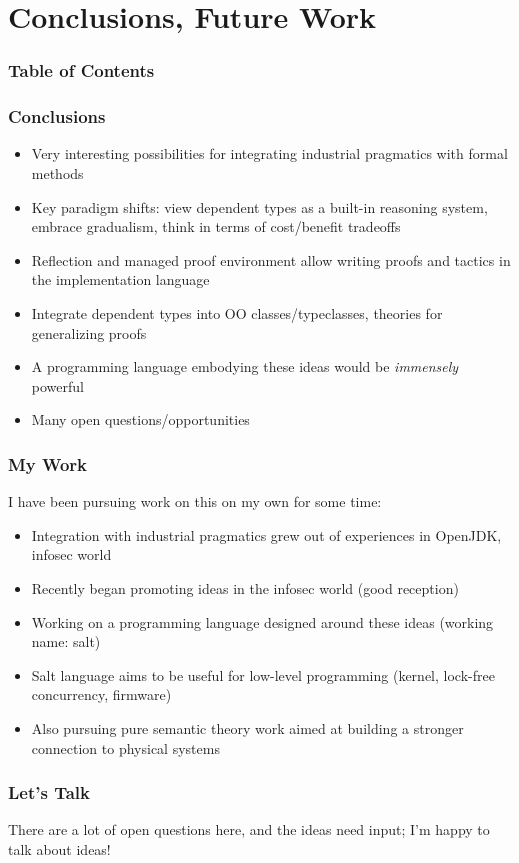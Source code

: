 \documentclass{beamer}
\begin{document}
\section{Conclusions, Future Work}

\begin{frame}
  \frametitle{Table of Contents}
  \tableofcontents[currentsection]
\end{frame}


\begin{frame}
  \frametitle{Conclusions}
  \begin{itemize}
    \item Very interesting possibilities for integrating industrial
      pragmatics with formal methods
    \item Key paradigm shifts: view dependent types as a built-in
      reasoning system, embrace gradualism, think in terms of
      cost/benefit tradeoffs
    \item Reflection and managed proof environment allow writing
      proofs and tactics in the implementation language
    \item Integrate dependent types into OO classes/typeclasses,
      theories for generalizing proofs
    \item A programming language embodying these ideas would be
      \emph{immensely} powerful
    \item Many open questions/opportunities
  \end{itemize}
\end{frame}

\begin{frame}
  \frametitle{My Work}
  I have been pursuing work on this on my own for some time:
  \begin{itemize}
    \item Integration with industrial pragmatics grew out of
      experiences in OpenJDK, infosec world
    \item Recently began promoting ideas in the infosec world (good reception)
    \item Working on a programming language designed around these
      ideas (working name: salt)
    \item Salt language aims to be useful for low-level programming
      (kernel, lock-free concurrency, firmware)
    \item Also pursuing pure semantic theory work aimed at building a
      stronger connection to physical systems
  \end{itemize}
\end{frame}

\begin{frame}
  \frametitle{Let's Talk}

  There are a lot of open questions here, and the ideas need input;
  I'm happy to talk about ideas!
\end{frame}
\end{document}

